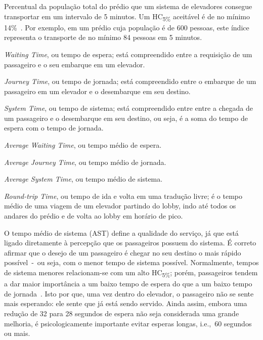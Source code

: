 \begin{description}[leftmargin=!,labelwidth=\widthof{\bfseries HC\textsubscript{5\%}}]
  \item[HC\textsubscript{5\%}]
  Percentual da população total do prédio que um sistema de elevadores consegue
  transportar em um intervalo de 5 minutos. Um HC\textsubscript{5\%} aceitável é
   de no mínimo 14\%~\cite{KOEHLEROTTIGER02}. Por exemplo, em um prédio cuja
   população é de 600 pessoas, este índice representa o transporte de no mínimo
   84 pessoas em 5 minutos.

  \item[WT]
  \textit{Waiting Time}, ou tempo de espera; está compreendido entre a
  requisição de um passageiro e o seu embarque em um elevador.

  \item[JT]
  \textit{Journey Time}, ou tempo de jornada; está compreendido entre o embarque
   de um passageiro em um elevador e o desembarque em seu destino.

  \item[ST]
  \textit{System Time}, ou tempo de sistema; está compreendido entre entre a
  chegada de um passageiro e o desembarque em seu destino, ou seja, é a soma do
  tempo de espera com o tempo de jornada.

  \item[AWT]
  \textit{Average Waiting Time}, ou tempo médio de espera.

  \item[AJT]
  \textit{Average Journey Time}, ou tempo médio de jornada.

  \item[AST]
  \textit{Average System Time}, ou tempo médio de sistema.

  \item[RTT]
  \textit{Round-trip Time}, ou tempo de ida e volta em uma tradução livre; é o
  tempo médio de uma viagem de um elevador partindo do lobby, indo até todos os
  andares do prédio e de volta ao lobby em horário de pico.
\end{description}

O tempo médio de sistema (AST) define a qualidade do serviço, já que está ligado
diretamente à percepção que os passageiros possuem do sistema. É correto afirmar
que o desejo de um passageiro é chegar no seu destino o mais rápido
possível~-~ou seja, com o menor tempo de sistema possível. Normalmente, tempos
de sistema menores relacionam-se com um alto HC\textsubscript{5\%}; porém,
passageiros tendem a dar maior importância a um baixo tempo de espera do que a
um baixo tempo de jornada~\cite{KOEHLEROTTIGER02}. Isto por que, uma vez dentro
do elevador, o passageiro não se sente mais esperando: ele sente que já está
sendo servido. Ainda assim, embora uma redução de 32 para 28 segundos de espera
não seja considerada uma grande melhoria, é psicologicamente importante evitar
esperas longas, i.e.,~60 segundos ou mais.


